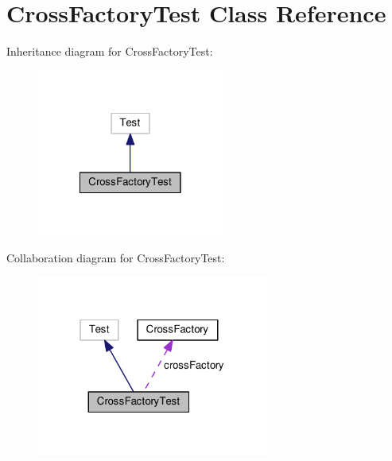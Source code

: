 \hypertarget{classCrossFactoryTest}{\section{Cross\-Factory\-Test Class Reference}
\label{classCrossFactoryTest}
}


Inheritance diagram for Cross\-Factory\-Test\-:
\nopagebreak
\begin{figure}[H]
\begin{center}
\leavevmode
\includegraphics[width=174pt]{classCrossFactoryTest__inherit__graph}
\end{center}
\end{figure}


Collaboration diagram for Cross\-Factory\-Test\-:
\nopagebreak
\begin{figure}[H]
\begin{center}
\leavevmode
\includegraphics[width=217pt]{classCrossFactoryTest__coll__graph}
\end{center}
\end{figure}
